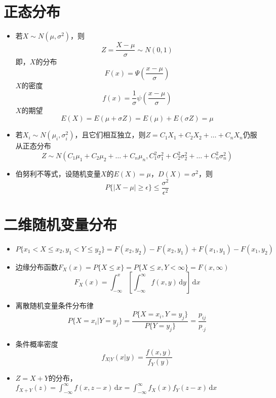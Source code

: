 \documentclass[UTF8]{ctexart}
\newcommand{\ud}{\,\mathrm{d}}
\begin{document}
\section{正态分布}
\begin{itemize}

	\item 若$X\sim N(\mu,\sigma^2)$，则
	\[
		Z = \frac{X-\mu}{\sigma} \sim N(0,1)
	\]
	即，$X$的分布
	\[
		F(x) = \Psi(\frac{x-\mu}{\sigma})
	\]
	$X$的密度
	\[
		f(x) = \frac{1}{\sigma} \psi(\frac{x-\mu}{\sigma})
	\]
	$X$的期望
	\[
		E(X) = E(\mu+\sigma Z) = E(\mu) + E(\sigma Z) = \mu
	\]

	\item 若$X_i\sim N(\mu_i,\sigma_i^2)$，且它们相互独立，则$Z=C_1X_1+C_2X_2+\dots + C_nX_n$仍服从正态分布
	\[
		Z \sim N(C_1\mu_1 +C_2\mu_2+ \dots +C_n\mu_n,C_1^2\sigma^2_1 +C_2^2\sigma^2_2+ \dots +C_n^2\sigma^2_n)
	\]


	\item 伯努利不等式，设随机变量$X$的$E(X) = \mu $，$D(X) = \sigma^2$，则
	\[
		P\{ |X-\mu| \geq \epsilon \} \leq \frac{\sigma^2}{\epsilon^2}
	\]

\end{itemize}


\section{二维随机变量分布}
\begin{itemize}

	\item $P\{x_1 < X \leq x_2, y_1< Y \leq y_2\}=F(x_2,y_2)-F(x_2,y_1)+F(x_1,y_1)-F(x_1,y_2)$

	\item 边缘分布函数$F_X(x)=P\{X\leq x\}=P\{X\leq x,Y<\infty\}=F(x,\infty)$
	\[
		F_X(x)= \int_{-\infty}^x\left[\int_{-\infty}^{\infty}f(x,y)\ud{y}\right]\ud{x}
	\]
	\item 离散随机变量条件分布律
	\[
		P\{X = x_i| Y=y_j\}=\frac{P\{X = x_i, Y=y_j\}}{P\{Y=y_j\}} = \frac{p_{ij}}{p_{\cdot j}}
	\]

	\item 条件概率密度
	\[
		f_{X|Y}(x|y) = \frac{f(x,y)}{f_Y(y)}
	\]

	\item $Z=X+Y$的分布，$f_{X+Y}(z) = \int_{-\infty}^{\infty}f(x,z-x)\ud{x}=\int_{-\infty}^{\infty}f_X(x)f_Y(z-x)\ud{x}$
\end{itemize}
\end{document}
